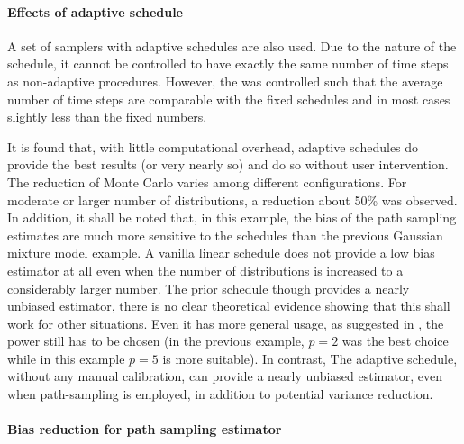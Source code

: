 


\paragraph{Effects of adaptive schedule}

A set of samplers with adaptive schedules are also used. Due to the nature of
the schedule, it cannot be controlled to have exactly the same number of time
steps as non-adaptive procedures. However, the \cess was controlled such that
the average number of time steps are comparable with the fixed schedules and
in most cases slightly less than the fixed numbers.

It is found that, with little computational overhead, adaptive schedules do
provide the best results (or very nearly so) and do so without user
intervention. The reduction of Monte Carlo \sd varies among different
configurations. For moderate or larger number of distributions, a reduction
about 50\% was observed. In addition, it shall be noted that, in this example,
the bias of the path sampling estimates are much more sensitive to the
schedules than the previous Gaussian mixture model example. A vanilla linear
schedule does not provide a low bias estimator at all even when the number of
distributions is increased to a considerably larger number. The prior schedule
though provides a nearly unbiased estimator, there is no clear theoretical
evidence showing that this shall work for other situations. Even it has more
general usage, as suggested in \cite{Calderhead:2009bd}, the power still has
to be chosen (in the previous \gmm example, $p = 2$ was the best choice while
in this \pet example $p = 5$ is more suitable). In contrast, The adaptive
schedule, without any manual calibration, can provide a nearly unbiased
estimator, even when path-sampling is employed, in addition to potential
variance reduction.

\paragraph{Bias reduction for path sampling estimator}



